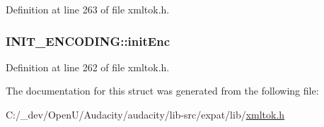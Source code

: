 Definition at line 263 of file xmltok.\+h.

\subsubsection[{\texorpdfstring{init\+Enc}{initEnc}}]{ I\+N\+I\+T\+\_\+\+E\+N\+C\+O\+D\+I\+N\+G\+::init\+Enc}\hypertarget{struct_i_n_i_t___e_n_c_o_d_i_n_g_af315cfdb5c933b05fdc0523f4d591221}{}\label{struct_i_n_i_t___e_n_c_o_d_i_n_g_af315cfdb5c933b05fdc0523f4d591221}


Definition at line 262 of file xmltok.\+h.



The documentation for this struct was generated from the following file\+:\begin{DoxyCompactItemize}
\item 
C\+:/\+\_\+dev/\+Open\+U/\+Audacity/audacity/lib-\/src/expat/lib/\hyperlink{xmltok_8h}{xmltok.\+h}\end{DoxyCompactItemize}
